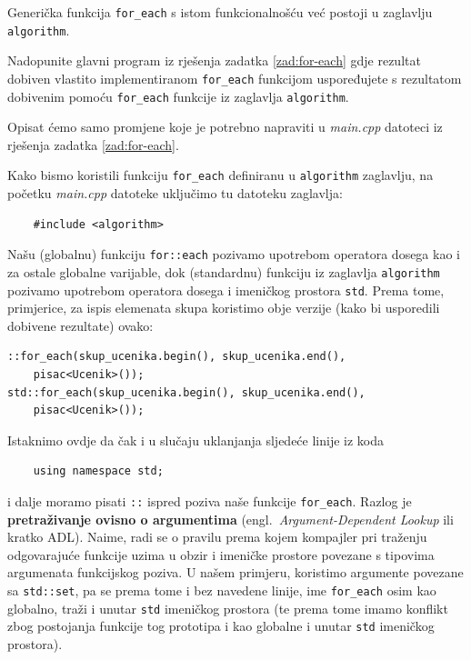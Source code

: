 Generička funkcija \texttt{for\_each} s istom
funkcionalnošću već postoji u zaglavlju \texttt{algorithm}.

\begin{zadatak}
    Nadopunite glavni program iz rješenja zadatka \ref{zad:for-each}
    gdje rezultat dobiven vlastito implementiranom \texttt{for\_each} funkcijom 
    uspoređujete 
    s rezultatom dobivenim pomoću \texttt{for\_each}
    funkcije iz zaglavlja \texttt{algorithm}.
\end{zadatak}


\begin{rjesenje}
    Opisat ćemo samo promjene koje je potrebno napraviti
    u \textit{main.cpp}
    datoteci iz rješenja zadatka \ref{zad:for-each}.
    \medskip

    Kako bismo koristili funkciju \texttt{for\_each}
    definiranu u \texttt{algorithm} 
    zaglavlju, na početku \textit{main.cpp} datoteke uključimo tu datoteku zaglavlja:
    \begin{verbatim}
    #include <algorithm>
    \end{verbatim}
    Našu (globalnu) funkciju \texttt{for::each} pozivamo
    upotrebom operatora dosega kao i za ostale globalne varijable, dok 
    (standardnu) funkciju iz zaglavlja \texttt{algorithm}
    pozivamo upotrebom operatora dosega i imeničkog prostora \texttt{std}.
    Prema tome, primjerice,
    za ispis elemenata skupa koristimo obje verzije (kako bi usporedili dobivene rezultate) ovako:
    \begin{verbatim}
::for_each(skup_ucenika.begin(), skup_ucenika.end(),
    pisac<Ucenik>());
std::for_each(skup_ucenika.begin(), skup_ucenika.end(),
    pisac<Ucenik>());
    \end{verbatim}

    Istaknimo ovdje da čak i u slučaju uklanjanja sljedeće linije iz koda
    \begin{verbatim}
    using namespace std;
    \end{verbatim}
    i dalje moramo pisati \texttt{::} ispred poziva naše funkcije \texttt{for\_each}.
    Razlog je \textbf{pretraživanje ovisno o argumentima}
    (engl.\ \textit{Argument-Dependent Lookup} ili kratko ADL).
    Naime, radi se o pravilu prema kojem kompajler pri traženju odgovarajuće funkcije 
    uzima u obzir i imeničke prostore povezane s tipovima argumenata funkcijskog poziva.
    U našem primjeru, koristimo argumente povezane sa \texttt{std::set},
    pa se prema tome i bez navedene linije, ime \texttt{for\_each} osim kao globalno, traži i unutar
    \texttt{std} imeničkog prostora
    (te prema tome imamo konflikt zbog postojanja funkcije tog prototipa i kao globalne i unutar \texttt{std} imeničkog prostora).
\end{rjesenje}


